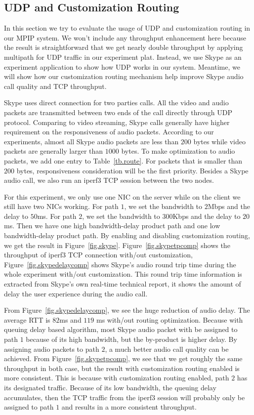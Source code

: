 \subsection{UDP and Customization Routing}
\label{sec:udp}

In this section we try to evaluate the usage of UDP and customization routing in our MPIP system. We won't include any throughput enhancement here because the result is straightforward that we get nearly double throughput by applying multipath for UDP traffic in our experiment plat. Instead, we use Skype\cite{skype} as an experiment application to show how UDP works in our system. Meantime, we will show how our customization routing mechanism help improve Skype audio call quality and TCP throughput.

Skype uses direct connection for two parties calls. All the video and audio packets are transmitted between two ends of the call directly through UDP protocol. Comparing to video streaming, Skype calls generally have higher requirement on the responsiveness of audio packets. According to our experiments, almost all Skype audio packets are less than $200$ bytes while video packets are generally larger than $1000$ bytes. To make optimization to audio packets, we add one entry to Table~\ref{tb.route}. For packets that is smaller than $200$ bytes, responsiveness consideration will be the first priority. Besides a Skype audio call, we also run an iperf3 TCP session between the two nodes.

For this experiment, we only use one NIC on the server while on the client we still have two NICs working. For path $1$, we set the bandwidth to $2$Mbps and the delay to $50$ms. For path $2$, we set the bandwidth to $300$Kbps and the delay to $20$ms. Then we have one high bandwidth-delay product path and one low bandwidth-delay product path. By enabling and disabling customization routing, we get the result in Figure~\ref{fig.skype}. Figure~\ref{fig.skypetpcomp} shows the throughput of iperf3 TCP connection with/out customization, Figure~\ref{fig.skypedelaycomp} shows Skype's audio round trip time during the whole experiment with/out customization. This round trip time information is extracted from Skype's own real-time technical report, it shows the amount of delay the user experience during the audio call.

From Figure~\ref{fig.skypedelaycomp}, we see the huge reduction of audio delay. The average RTT is $82$ms and $119$ ms with/out routing optimization. Because with queuing delay based algorithm, most Skype audio packet with be assigned to path $1$ because of its high bandwidth, but the by-product is higher delay. By assigning audio packets to path $2$, a much better audio call quality can be achieved. From Figure~\ref{fig.skypetpcomp}, we see that we get roughly the same throughput in both case, but the result with customization routing enabled is more consistent. This is because with customization routing enabled, path $2$ has its designated traffic. Because of its low bandwidth, the queuing delay accumulates, then the TCP traffic from the iperf3 session will probably only be assigned to path $1$ and results in a more consistent throughput.

